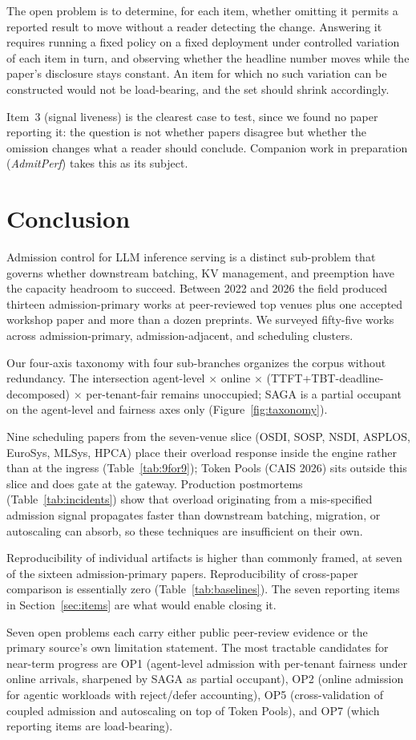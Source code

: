 \documentclass[10pt]{article} %
\theoremstyle{definition}
\newcommand{\companionwork}{Companion work in preparation
    (\emph{AdmitPerf}) takes this as its subject.}
\newcommand{\companionwork}{Companion work by the present authors,
    in preparation, takes this as its subject; it is not cited here so
    as to preserve anonymity.}
\begin{document}
The open problem is to determine, for each item, whether omitting it
permits a reported result to move without a reader detecting the
change. Answering it requires running a fixed policy on a fixed
deployment under controlled variation of each item in turn, and
observing whether the headline number moves while the paper's
disclosure stays constant. An item for which no such variation can be
constructed would not be load-bearing, and the set should shrink
accordingly.

Item~3 (signal liveness) is the clearest case to test, since we found
no paper reporting it: the question is not whether papers disagree but whether the
omission changes what a reader should conclude. \companionwork

\section{Conclusion}
\label{sec:conc}

Admission control for LLM inference serving is a distinct sub-problem
that governs whether downstream batching, KV management, and
preemption have the capacity headroom to succeed. Between 2022 and
2026 the field produced thirteen admission-primary works at
peer-reviewed top venues plus one accepted workshop paper and more
than a dozen preprints. We surveyed fifty-five works across
admission-primary, admission-adjacent, and scheduling clusters.

Our four-axis taxonomy with four sub-branches organizes the corpus
without redundancy. The intersection agent-level $\times$ online
$\times$ (TTFT+TBT-deadline-decomposed) $\times$ per-tenant-fair
remains unoccupied; SAGA is a partial occupant on the agent-level
and fairness axes only (Figure~\ref{fig:taxonomy}).

Nine scheduling papers from the seven-venue slice (OSDI, SOSP,
NSDI, ASPLOS, EuroSys, MLSys, HPCA) place their overload response
inside the engine rather than at the ingress
(Table~\ref{tab:9for9}); Token Pools (CAIS 2026) sits outside this
slice and does gate at the gateway.
Production postmortems
(Table~\ref{tab:incidents}) show that overload originating from a
mis-specified admission signal propagates faster than downstream
batching, migration, or autoscaling can absorb, so these techniques
are insufficient on their own.

Reproducibility of individual artifacts is higher than commonly
framed, at seven of the sixteen admission-primary papers.
Reproducibility of cross-paper comparison is essentially zero
(Table~\ref{tab:baselines}). The seven reporting items in
Section~\ref{sec:items} are what would enable closing it.

Seven open problems each carry either public peer-review evidence or
the primary source's own limitation statement. The most tractable
candidates for near-term progress are OP1 (agent-level admission
with per-tenant fairness under online arrivals, sharpened by SAGA
as partial occupant), OP2 (online admission for agentic workloads
with reject/defer accounting), OP5 (cross-validation of coupled
admission and autoscaling on top of Token Pools), and OP7 (which
reporting items are load-bearing).



\end{document}
